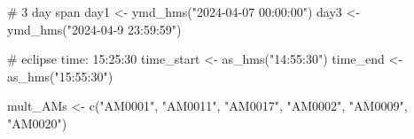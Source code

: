 \documentclass[
  letterpaper,
  DIV=11,
  numbers=noendperiod]{scrartcl}
\newenvironment{Shaded}{\begin{snugshade}}{\end{snugshade}}
\newcommand{\CommentTok}[1]{\textcolor[rgb]{0.37,0.37,0.37}{#1}}
\newcommand{\FunctionTok}[1]{\textcolor[rgb]{0.28,0.35,0.67}{#1}}
\newcommand{\NormalTok}[1]{\textcolor[rgb]{0.00,0.23,0.31}{#1}}
\newcommand{\OtherTok}[1]{\textcolor[rgb]{0.00,0.23,0.31}{#1}}
\newcommand{\StringTok}[1]{\textcolor[rgb]{0.13,0.47,0.30}{#1}}
\begin{document}
\begin{Shaded}
\begin{Highlighting}[]
\CommentTok{\# 3 day span}
\NormalTok{day1 }\OtherTok{\textless{}{-}} \FunctionTok{ymd\_hms}\NormalTok{(}\StringTok{"2024{-}04{-}07 00:00:00"}\NormalTok{)}
\NormalTok{day3 }\OtherTok{\textless{}{-}} \FunctionTok{ymd\_hms}\NormalTok{(}\StringTok{"2024{-}04{-}9 23:59:59"}\NormalTok{)}

\CommentTok{\# eclipse time: 15:25:30}
\NormalTok{time\_start }\OtherTok{\textless{}{-}} \FunctionTok{as\_hms}\NormalTok{(}\StringTok{"14:55:30"}\NormalTok{)}
\NormalTok{time\_end }\OtherTok{\textless{}{-}} \FunctionTok{as\_hms}\NormalTok{(}\StringTok{"15:55:30"}\NormalTok{)}

\NormalTok{mult\_AMs }\OtherTok{\textless{}{-}} \FunctionTok{c}\NormalTok{(}\StringTok{"AM0001"}\NormalTok{, }\StringTok{"AM0011"}\NormalTok{, }\StringTok{"AM0017"}\NormalTok{, }\StringTok{"AM0002"}\NormalTok{, }\StringTok{"AM0009"}\NormalTok{, }\StringTok{"AM0020"}\NormalTok{)}


\end{Highlighting}
\end{Shaded}
\end{document}
